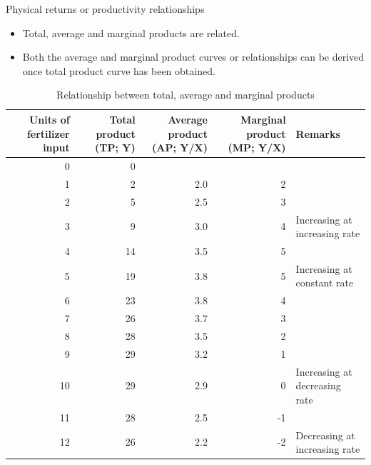 \documentclass[12pt,ignorenonframetext,aspectratio=169]{beamer}
\providecommand{\tightlist}{%
  \setlength{\itemsep}{0pt}\setlength{\parskip}{0pt}}
\begin{document}
\begin{frame}{Physical returns or productivity relationships}
\protect\hypertarget{physical-returns-or-productivity-relationships}{}
\begin{itemize}
\tightlist
\item
  Total, average and marginal products are related.
\item
  Both the average and marginal product curves or relationships can be
  derived once total product curve has been obtained.
\end{itemize}
\end{frame}

\begin{frame}{}
\protect\hypertarget{section-9}{}
\begin{table}

\caption{\label{tab:tc-ac-mc-relationship}Relationship between total, average and marginal products}
\centering
\fontsize{6}{8}\selectfont
\begin{tabular}[t]{rrrrl}
\toprule
Units of fertilizer input & Total product (TP; Y) & Average product (AP; Y/X) & Marginal product (MP; Y/X) & Remarks\\
\midrule
\rowcolor{gray!6}  0 & 0 &  &  & \\

1 & 2 & 2.0 & 2 & \\

\rowcolor{gray!6}  2 & 5 & 2.5 & 3 & \\

3 & 9 & 3.0 & 4 & \multirow{-4}{*}{\raggedright\arraybackslash Increasing at increasing rate}\\
\cmidrule{1-5}
\rowcolor{gray!6}  4 & 14 & 3.5 & 5 & \\

5 & 19 & 3.8 & 5 & \multirow{-2}{*}{\raggedright\arraybackslash Increasing at constant rate}\\
\cmidrule{1-5}
\rowcolor{gray!6}  6 & 23 & 3.8 & 4 & \\

7 & 26 & 3.7 & 3 & \\

\rowcolor{gray!6}  8 & 28 & 3.5 & 2 & \\

9 & 29 & 3.2 & 1 & \\

\rowcolor{gray!6}  10 & 29 & 2.9 & 0 & \multirow{-5}{*}{\raggedright\arraybackslash Increasing at decreasing rate}\\
\cmidrule{1-5}
11 & 28 & 2.5 & -1 & \\

\rowcolor{gray!6}  12 & 26 & 2.2 & -2 & \multirow{-2}{*}{\raggedright\arraybackslash Decreasing at increasing rate}\\
\bottomrule
\end{tabular}
\end{table}
\end{frame}
\end{document}
